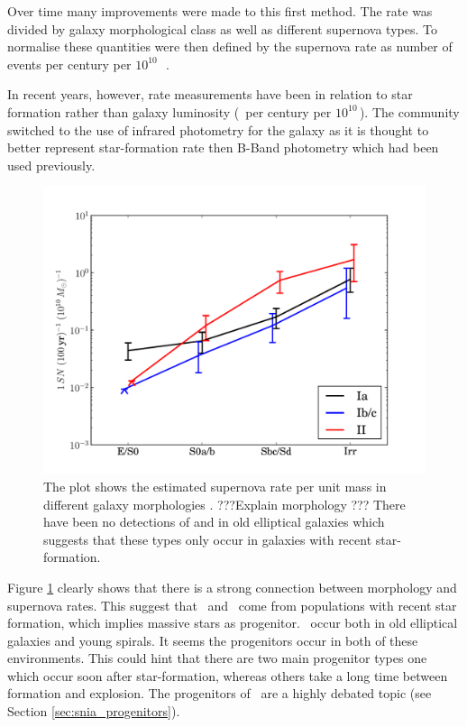 Over time many improvements were made to this first method. The rate was divided by galaxy morphological class as well as different supernova types. To normalise these quantities were then defined by the supernova rate as number of events per century per $10^{10}$\,\lsun\ \citep[e.g.][]{1991ARA&A..29..363V,1994ApJS...92..487T}. 

In recent years, however, rate measurements have been in relation to star formation rather than galaxy luminosity (\sn\ per century per $10^{10}$\,\msun).  The community \citep[e.g.][]{2005A&A...433..807M} switched to the use of infrared photometry for the galaxy as it is thought to better represent star-formation rate then B-Band photometry \citep{2003A&A...410...83H} which had been used previously. 
\begin{figure}[htbp] %
   \centering
   \includegraphics[width=\textwidth]{chapter_intro/plots/snrates_mannucci05.pdf} 
   \caption{The plot shows the estimated supernova rate per unit mass in different galaxy morphologies \citep{2005A&A...433..807M}. ???Explain morphology ??? There have been no detections of  and  in old elliptical galaxies which suggests that these types only occur in galaxies with recent star-formation.}
   \label{fig:snrates_mannucci05}
\end{figure}

Figure \ref{fig:snrates_mannucci05} clearly shows that there is a strong connection between morphology and supernova rates. This suggest that \sneii\ and \sneibc\ come from populations with recent star formation, which implies massive stars as progenitor. \sneia\ occur both in old elliptical galaxies and young spirals. It seems the progenitors occur in both of these environments. This could hint that there are two main progenitor types one which occur soon after star-formation, whereas others take a long time between formation and explosion. The progenitors of \sneia\ are a highly debated topic (see Section \ref{sec:snia_progenitors}).

